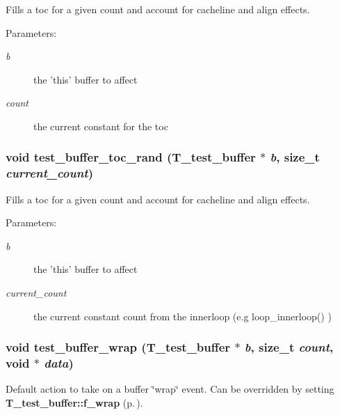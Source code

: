 Fills a toc for a given count and account for cacheline and align effects.

\begin{Desc}
\item[Parameters: ]\par
\begin{description}
\item[{\em 
b}]the 'this' buffer to affect \item[{\em 
count}]the current constant for the toc \end{description}
\end{Desc}
\subsubsection{\setlength{\rightskip}{0pt plus 5cm}void test\_\-buffer\_\-toc\_\-rand ({\bf T\_\-test\_\-buffer} $\ast$ {\em b}, size\_\-t {\em current\_\-count})}\label{group__test__buffer_a2}


Fills a toc for a given count and account for cacheline and align effects.

\begin{Desc}
\item[Parameters: ]\par
\begin{description}
\item[{\em 
b}]the 'this' buffer to affect \item[{\em 
current\_\-count}]the current constant count from the innerloop (e.g loop\_\-innerloop() ) \end{description}
\end{Desc}
\subsubsection{\setlength{\rightskip}{0pt plus 5cm}void test\_\-buffer\_\-wrap ({\bf T\_\-test\_\-buffer} $\ast$ {\em b}, size\_\-t {\em count}, void $\ast$ {\em data})}\label{group__test__buffer_a9}


Default action to take on a buffer \char`\"{}wrap\char`\"{} event. Can be overridden by setting {\bf T\_\-test\_\-buffer::f\_\-wrap} {\rm (p.\,\pageref{structT__test__buffer_m20})}.

